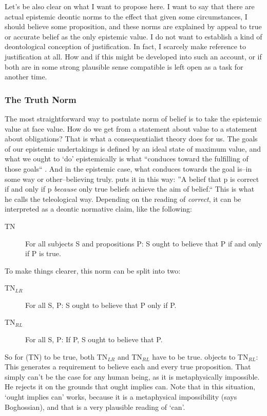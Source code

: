 \documentclass[12pt,numbers=noenddot]{scrartcl}
\begin{document}
Let's be also clear on what I want to propose here. I want to say that there are actual epistemic deontic norms to the effect that given some circumstances, I should believe some proposition, and these norms are explained by appeal to true or accurate belief as the only epistemic value. I do not want to establish a kind of deontological conception of justification. In fact, I scarcely make reference to justification at all. How and if this might be developed into such an account, or if both are in some strong plausible sense compatible is left open as a task for another time.

\subsubsection{The Truth Norm}

The most straightforward way to postulate norm of belief is to take the epistemic value at face value. How do we get from a statement about value to a statement about obligations? That is what a consequentialist theory does for us. The goals of our epistemic undertakings is defined by an ideal state of maximum value, and what we ought to ‘do’ epistemically is what “conduces toward the fulfilling of those goals“ \autocite[340]{Berker2013-BERETA-2}. And in the epistemic case, what conduces towards the goal is–in some way or other–believing truly. \textcite[35]{Engel199} puts it in this way: ”A belief that p is correct if and only if p \emph{because} only true beliefs achieve the aim of belief.“ This is what he calls the teleological way. Depending on the reading of \emph{correct}, it can be interpreted as a deontic normative claim, like the following:

\begin{description}
    \item[TN] For all subjects S and propositions P: S ought to believe that P if and only if P is true.
\end{description}

To make things clearer, this norm can be split into two:

\begin{description}
    \item[TN$_{LR}$] For all S, P: S ought to believe that P only if P.
    \item[TN$_{RL}$] For all S, P: If P, S ought to believe that P.
\end{description}

So for (TN) to be true, both TN$_{LR}$ and TN$_{RL}$ have to be true. \textcite[37]{Boghossian2003-BOGTNO} objects to TN$_{RL}$: This generates a requirement to believe each and every true proposition. That simply can't be the case for any human being, as it is metaphysically impossible. He rejects it on the grounds that ought implies can. Note that in this situation, ‘ought implies can’ works, because it is a metaphysical impossibility (says Boghossian), and that is a very plausible reading of ‘can’.
\end{document}
